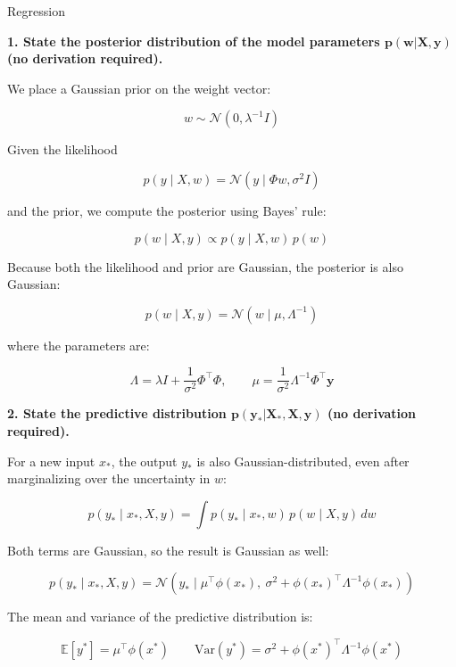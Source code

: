 \documentclass[
	english,
        solution=true
	]{tudaexercise}
\begin{document}
\begin{task}[points=34]{Regression}
\begin{subtask}[points=10, title=Bayesian Linear Regression]
        \begin{solution}
            \textbf{1. State the posterior distribution of the model parameters $\bm{p(w | X, y)}$ (no derivation required).}

            We place a Gaussian prior on the weight vector:

            \[
            w \sim \mathcal{N}(0, \lambda^{-1} I)
            \]

            Given the likelihood
            
            \[
            p(y \mid X, w) = \mathcal{N}(y \mid \Phi w, \sigma^2 I)
            \]
            
            and the prior, we compute the posterior using Bayes' rule:
            
            \[
            p(w \mid X, y) \propto p(y \mid X, w)\, p(w)
            \]

            Because both the likelihood and prior are Gaussian, the posterior is also Gaussian:
            
            \[
            p(w \mid X, y) = \mathcal{N}(w \mid \mu, \Lambda^{-1})
            \]

            where the parameters are:

            \[
            \Lambda = \lambda I + \frac{1}{\sigma^2} \Phi^\top \Phi,
            \qquad
            \mu = \frac{1}{\sigma^2} \Lambda^{-1} \Phi^\top \mathbf{y}
            \]

            \vspace{2em}

            \textbf{2. State the predictive distribution $\bm{p(y_* | X_*, X, y)}$ (no derivation required).}

            For a new input $x_*$, the output $y_*$ is also Gaussian-distributed, even after marginalizing over the uncertainty in $w$:
            
            \[
            p(y_* \mid x_*, X, y) = \int p(y_* \mid x_*, w)\, p(w \mid X, y)\, dw
            \]

            Both terms are Gaussian, so the result is Gaussian as well:
            
            \[
            p(y_* \mid x_*, X, y) = \mathcal{N}(y_* \mid \mu^\top \phi(x_*),\ \sigma^2 + \phi(x_*)^\top \Lambda^{-1} \phi(x_*))
            \]

            The mean and variance of the predictive distribution is:
            
            \[
            \mathbb{E}[y^*] = \mu^\top \phi(x^*)
            \qquad
            \text{Var}(y^*) = \sigma^2 + \phi(x^*)^\top \Lambda^{-1} \phi(x^*)
            \]


\end{solution}
\end{subtask}
\end{task}
\end{document}
